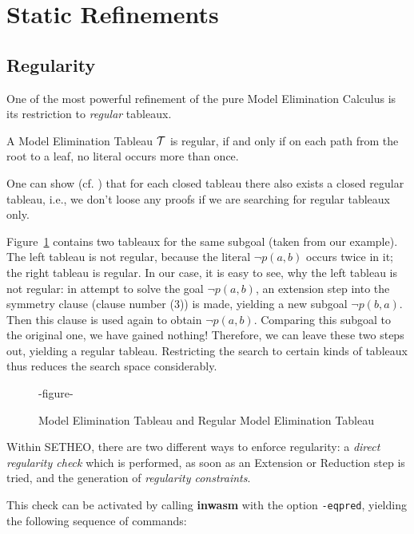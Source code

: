 \section{Static Refinements}
\subsection{Regularity}

One of the most powerful refinement of the pure Model Elimination
Calculus is its restriction to {\em regular\/} tableaux.

\begin{definition}
A Model Elimination Tableau $\cal T$ is regular, if and only if on
each path from the root to a leaf, no literal occurs more than once.
\end{definition}

One can show (cf. \cite{LSBB92,LMG94}) that for each closed tableau
there also exists a closed regular tableau, i.e., we don't loose any
proofs if we are searching for regular tableaux only.

Figure~\ref{fig:tut2:reg-tab} contains two tableaux for the same
subgoal (taken from our example). The left tableau is not regular,
because the literal $\neg p(a,b)$ occurs twice in it; the right tableau
is regular. In our case, it is easy to see, why the left tableau is
not regular: in attempt to solve the goal $\neg p(a,b)$, an extension
step into the symmetry clause (clause number (3)) is made, yielding
a new subgoal $\neg p(b,a)$. Then this clause is used again to
obtain $\neg p(a,b)$. Comparing this subgoal to the original one,
we have gained nothing! Therefore, we can leave these two steps out,
yielding a regular tableau. Restricting the search to certain kinds
of tableaux thus reduces the search space considerably.

\begin{figure}[htb]
-figure-
\caption{Model Elimination Tableau and Regular Model Elimination Tableau}
\label{fig:tut2:reg-tab}
\end{figure}

Within SETHEO, there are two different ways to enforce regularity:
a {\em direct regularity check\/} which is performed, as soon as an
Extension or Reduction step is tried, and the generation of {\em
regularity constraints\/}. 

 This check can be
activated by calling {\bf inwasm} with the option {\tt -eqpred},
yielding the following sequence of commands:

